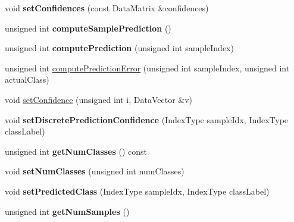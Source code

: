 \begin{DoxyCompactItemize}
\item 
\hypertarget{classffactory_1_1_prediction_a3085c19747dbe56851b6e628761040fc}{void {\bfseries set\-Confidences} (const Data\-Matrix \&confidences)}\label{classffactory_1_1_prediction_a3085c19747dbe56851b6e628761040fc}

\item 
\hypertarget{classffactory_1_1_prediction_a80ff7d4d1245a1e104ed2792afb44446}{unsigned int {\bfseries compute\-Sample\-Prediction} ()}\label{classffactory_1_1_prediction_a80ff7d4d1245a1e104ed2792afb44446}

\item 
\hypertarget{classffactory_1_1_prediction_a44a27558d9e16af4ab6097fbfa11c91d}{unsigned int {\bfseries compute\-Prediction} (unsigned int sample\-Index)}\label{classffactory_1_1_prediction_a44a27558d9e16af4ab6097fbfa11c91d}

\item 
unsigned int \hyperlink{classffactory_1_1_prediction_a4b9e20296afa9b6af3d14ccabb69f82b}{compute\-Prediction\-Error} (unsigned int sample\-Index, unsigned int actual\-Class)
\item 
void \hyperlink{classffactory_1_1_prediction_a3b821011f300ae5fd5464d7ec5d5e722}{set\-Confidence} (unsigned int i, Data\-Vector \&v)
\item 
\hypertarget{classffactory_1_1_prediction_aadea9a272450e10e415157fad43dec36}{void {\bfseries set\-Discrete\-Prediction\-Confidence} (Index\-Type sample\-Idx, Index\-Type class\-Label)}\label{classffactory_1_1_prediction_aadea9a272450e10e415157fad43dec36}

\item 
\hypertarget{classffactory_1_1_prediction_a1c3b352c4bc233c187ec912c5ee00934}{unsigned int {\bfseries get\-Num\-Classes} () const }\label{classffactory_1_1_prediction_a1c3b352c4bc233c187ec912c5ee00934}

\item 
\hypertarget{classffactory_1_1_prediction_ae5c120c2bb7cabc63d6fdc8e5631bd59}{void {\bfseries set\-Num\-Classes} (unsigned int num\-Classes)}\label{classffactory_1_1_prediction_ae5c120c2bb7cabc63d6fdc8e5631bd59}

\item 
\hypertarget{classffactory_1_1_prediction_ae7ffd475b27b414a600c6a3c9f9eab73}{void {\bfseries set\-Predicted\-Class} (Index\-Type sample\-Idx, Index\-Type class\-Label)}\label{classffactory_1_1_prediction_ae7ffd475b27b414a600c6a3c9f9eab73}

\item 
\hypertarget{classffactory_1_1_prediction_a5732e33092e9a18e74fa7ab67d5a9848}{unsigned int {\bfseries get\-Num\-Samples} ()}\label{classffactory_1_1_prediction_a5732e33092e9a18e74fa7ab67d5a9848}


\end{DoxyCompactItemize}
